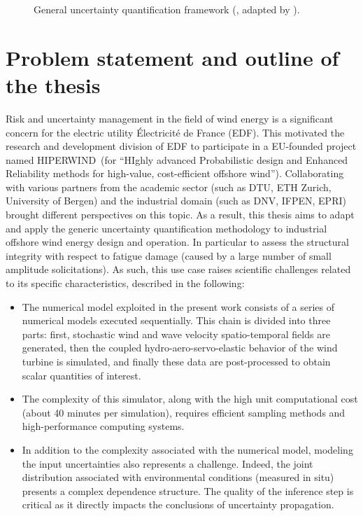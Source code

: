 \begin{figure}[!h]
    \centering
    
    \caption{General uncertainty quantification framework (\citealp{rocquigny_2008}, adapted by \citealp{ajenjo_2023}).}
    \label{fig:UQ_methodo}
\end{figure}


\section*{Problem statement and outline of the thesis}

Risk and uncertainty management in the field of wind energy is a significant concern for the electric utility Électricité de France (EDF). 
This motivated the research and development division of EDF to participate in a EU-founded project named HIPERWIND\footnotemark~(for ``HIghly advanced Probabilistic design and Enhanced Reliability methods for high-value, cost-efficient offshore wind''). 
Collaborating with various partners from the academic sector (such as DTU, ETH Zurich, University of Bergen) and the industrial domain (such as DNV, IFPEN, EPRI) brought different perspectives on this topic. 
As a result, this thesis aims to adapt and apply the generic uncertainty quantification methodology to industrial offshore wind energy design and operation. 
In particular to assess the structural integrity with respect to fatigue damage (caused by a large number of small amplitude solicitations). 
As such, this use case raises scientific challenges related to its specific characteristics, described in the following:
\begin{itemize}
    \item The numerical model exploited in the present work consists of a series of numerical models executed sequentially. 
    This chain is divided into three parts: first, stochastic wind and wave velocity spatio-temporal fields are generated, 
    then the coupled hydro-aero-servo-elastic behavior of the wind turbine is simulated, 
    and finally these data are post-processed to obtain scalar quantities of interest. 
    \item The complexity of this simulator, along with the high unit computational cost (about 40 minutes per simulation), requires efficient sampling methods and high-performance computing systems. 
    \item In addition to the complexity associated with the numerical model, modeling the input uncertainties also represents a challenge. 
    Indeed, the joint distribution associated with environmental conditions (measured in situ) presents a complex dependence structure.   
    The quality of the inference step is critical as it directly impacts the conclusions of uncertainty propagation.
\end{itemize}

